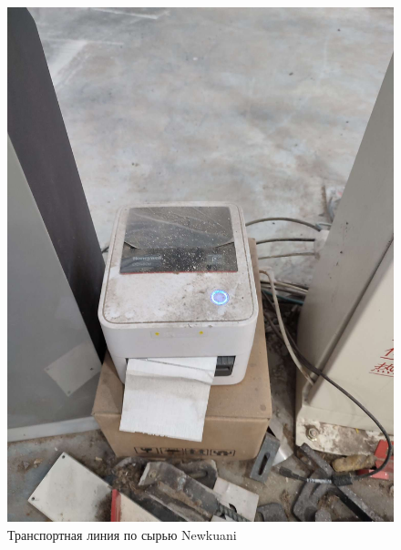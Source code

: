 \begin{figure}
\begin{center}
  \includegraphics[height=0.4\textheight, width=\textwidth, keepaspectratio]{Pics/d_Newkuani_4.JPEG}
\end{center}
  \caption{Транспортная линия по сырью Newkuani}
  \label{pic:d_Newkuani_4}
\end{figure}

